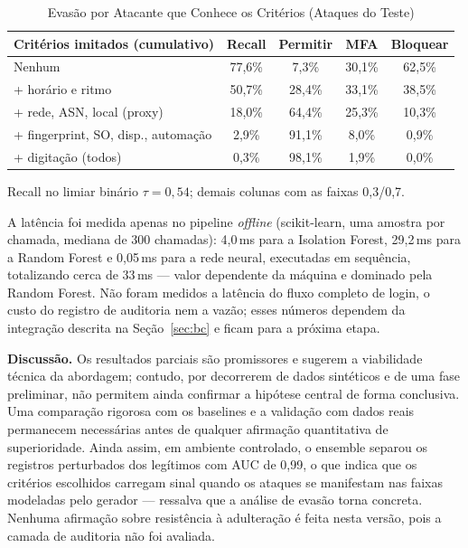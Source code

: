 \documentclass[conference]{IEEEtran}
\begin{document}
\begin{table}[t]
\caption{Evasão por Atacante que Conhece os Critérios (Ataques do Teste)}
\label{tab:evasion}
\centering
\footnotesize
\setlength{\tabcolsep}{3pt}
\renewcommand{\arraystretch}{1.15}
\begin{tabular}{@{}p{3.3cm}cccc@{}}
\toprule
\textbf{Critérios imitados (cumulativo)} & \textbf{Recall} & \textbf{Permitir} & \textbf{MFA} & \textbf{Bloquear} \\
\midrule
Nenhum & 77,6\% & 7,3\% & 30,1\% & 62,5\% \\
+ horário e ritmo & 50,7\% & 28,4\% & 33,1\% & 38,5\% \\
+ rede, ASN, local (proxy) & 18,0\% & 64,4\% & 25,3\% & 10,3\% \\
+ fingerprint, SO, disp., automação & 2,9\% & 91,1\% & 8,0\% & 0,9\% \\
+ digitação (todos) & 0,3\% & 98,1\% & 1,9\% & 0,0\% \\
\bottomrule
\end{tabular}

\vspace{2pt}
{\footnotesize Recall no limiar binário $\tau=0{,}54$; demais colunas com as faixas 0,3/0,7.}
\end{table}

A latência foi medida apenas no pipeline \emph{offline}
(scikit-learn, uma amostra por chamada, mediana de 300 chamadas): 4,0\,ms
para a Isolation Forest, 29,2\,ms para a Random Forest e 0,05\,ms para a
rede neural, executadas em sequência, totalizando cerca de 33\,ms --- valor
dependente da máquina e dominado pela Random Forest. Não foram medidos a
latência do fluxo completo de login, o custo do registro de auditoria nem
a vazão; esses números dependem da integração descrita na
Seção~\ref{sec:bc} e ficam para a próxima etapa.

\textbf{Discussão.} Os resultados parciais são promissores e sugerem a
viabilidade técnica da abordagem; contudo, por decorrerem de dados
sintéticos e de uma fase preliminar, não permitem ainda confirmar a
hipótese central de forma conclusiva. Uma comparação rigorosa com os
baselines e a validação com dados reais permanecem necessárias antes de
qualquer afirmação quantitativa de superioridade. Ainda assim, em
ambiente controlado, o ensemble separou os registros perturbados dos
legítimos com AUC de 0,99, o que indica que os critérios escolhidos
carregam sinal quando os ataques se manifestam nas faixas modeladas pelo
gerador --- ressalva que a análise de evasão torna concreta. Nenhuma afirmação sobre
resistência à adulteração é feita nesta versão, pois a camada de
auditoria não foi avaliada.
\end{document}
